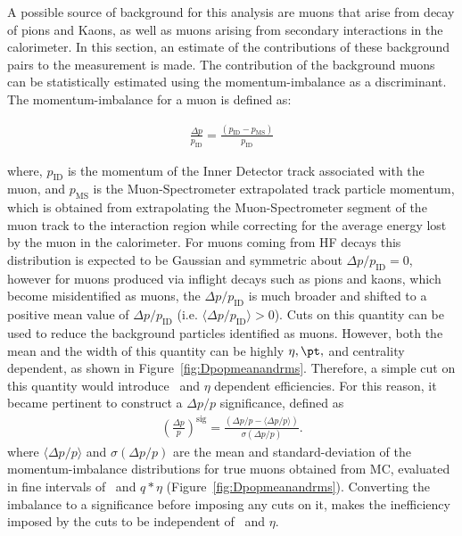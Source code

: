 A possible source of background for this analysis are muons 
  that arise from decay of pions and Kaons, as well as muons
  arising from secondary interactions in the calorimeter.
In this section, an estimate of the contributions of these
  background pairs to the measurement is made. 
The contribution of the background muons can be statistically 
  estimated using the momentum-imbalance as a discriminant.
The momentum-imbalance for a muon is defined as:


\begin{eqnarray}
  \frac{\Delta p}{p_{\mathrm{ID}}}=\frac{(p_{\mathrm{ID}}-p_{\mathrm{MS}})}{p_{\mathrm{ID}}}
\end{eqnarray}


where, $p_{\mathrm{ID}}$ is the momentum of the Inner Detector track associated with the muon,
  and $p_{\mathrm{MS}}$ is the Muon-Spectrometer extrapolated track particle momentum,
  which is obtained from extrapolating the Muon-Spectrometer segment of the muon track
  to the interaction region while correcting for the average energy lost by the muon in the calorimeter.
For muons coming from HF decays this distribution is expected to be Gaussian and symmetric about
  $\Delta p/p_{\mathrm{ID}}=0$, however for muons produced via inflight decays such as pions and kaons, which become
  misidentified as muons, the  $\Delta p/p_{\mathrm{ID}}$ is much broader and shifted to a positive mean value
  of $\Delta p/p_{\mathrm{ID}}$ (i.e. $\langle\Delta p/p_{\mathrm{ID}}\rangle>0$).
Cuts on this quantity can be used to reduce the background particles identified as muons. 
However, both the mean and the width of this quantity can be highly $\eta, \pt,$ 
  and centrality dependent, as shown in Figure~\ref{fig:Dpopmeanandrms}.
Therefore, a simple cut on this quantity would introduce \pt\ and $\eta$ dependent
  efficiencies.
For this reason, it became pertinent to construct a $\Delta p/p$ significance, 
  defined as
\begin{eqnarray}
  \left(\frac{\Delta p}{p}\right)^{\mathrm{sig}}=\frac{(\Delta p/p- \langle\Delta p/p\rangle)}{\sigma(\Delta p/p)}.
  \label{eq:dpopsig}
\end{eqnarray}
where  $\langle\Delta p/p\rangle$ and $\sigma(\Delta p/p)$ are the 
  mean and standard-deviation of the momentum-imbalance distributions
  for true muons obtained from MC, evaluated in fine intervals of \pt\ 
  and $q*\eta$ (Figure~\ref{fig:Dpopmeanandrms}).
Converting the imbalance to a significance before imposing any cuts on it,
  makes the inefficiency imposed by the cuts to be independent of \pt\ and $\eta$.

